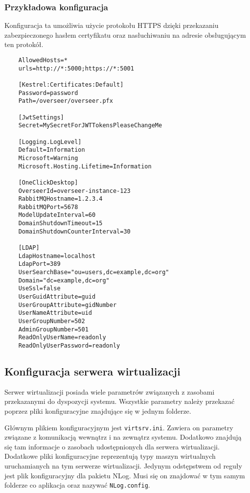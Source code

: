 \documentclass[../opis-rozwiazania.tex]{subfiles}
\begin{document}
\subsubsection{Przykładowa konfiguracja}

Konfiguracja ta umożliwia użycie protokołu HTTPS dzięki przekazaniu zabezpieczonego hasłem certyfikatu oraz nasłuchiwaniu na adresie obsługującym ten protokół.

\begin{verbatim}
	AllowedHosts=*
	urls=http://*:5000;https://*:5001

	[Kestrel:Certificates:Default]
	Password=password
	Path=/overseer/overseer.pfx

	[JwtSettings]
	Secret=MySecretForJWTTokensPleaseChangeMe

	[Logging.LogLevel]
	Default=Information
	Microsoft=Warning
	Microsoft.Hosting.Lifetime=Information

	[OneClickDesktop]
	OverseerId=overseer-instance-123
	RabbitMQHostname=1.2.3.4
	RabbitMQPort=5678
	ModelUpdateInterval=60
	DomainShutdownTimeout=15
	DomainShutdownCounterInterval=30

	[LDAP]
	LdapHostname=localhost
	LdapPort=389
	UserSearchBase="ou=users,dc=example,dc=org"
	Domain="dc=example,dc=org"
	UseSsl=false
	UserGuidAttribute=guid
	UserGroupAttribute=gidNumber
	UserNameAttribute=uid
	UserGroupNumber=502
	AdminGroupNumber=501
	ReadOnlyUserName=readonly
	ReadOnlyUserPassword=readonly
\end{verbatim}

\subsection{Konfiguracja serwera wirtualizacji}
\label{system_startup.virtsrv_conf}
Serwer wirtualizacji posiada wiele parametrów związanych z zasobami przekazanymi do dyspozycji systemu.
Wszystkie parametry należy przekazać poprzez pliki konfiguracyjne znajdujące się w jednym folderze.

Głównym plikiem konfiguracyjnym jest \texttt{virtsrv.ini}.
Zawiera on parametry związane z komunikacją wewnątrz i na zewnątrz systemu.
Dodatkowo znajdują się tam informacje o zasobach udostępnionych dla serwera wirtualizacji.
Dodatkowe pliki konfiguracyjne reprezentują typy maszyn wirtualnych uruchamianych na tym serwerze wirtualizacji.
Jedynym odstępstwem od reguły jest plik konfiguracyjny dla pakietu NLog.
Musi się on znajdować w tym samym folderze co aplikacja oraz nazywać \texttt{NLog.config}.
\end{document}

